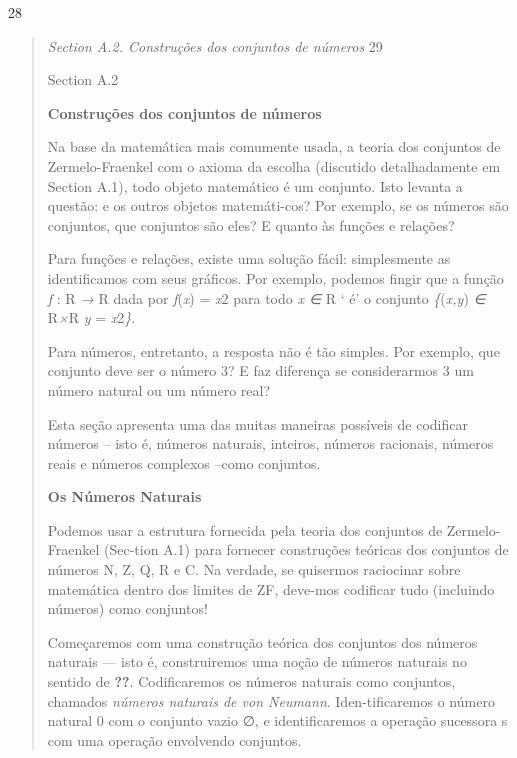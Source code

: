 \documentclass[
]{article}
\begin{document}
28

\begin{quote}
\emph{Section A.2. Construções dos conjuntos de números} 29

Section A.2

\textbf{Construções dos conjuntos de números}

Na base da matemática mais comumente usada, a teoria dos conjuntos de
Zermelo-Fraenkel com o axioma da escolha (discutido detalhadamente em
Section A.1), todo objeto matemático é um conjunto. Isto levanta a
questão: e os outros objetos matemáti-cos? Por exemplo, se os números
são conjuntos, que conjuntos são eles? E quanto às funções e relações?

Para funções e relações, existe uma solução fácil: simplesmente as
identificamos com seus gráficos. Por exemplo, podemos fingir que a
função \emph{f} : R \emph{→} R dada por \emph{f}(\emph{x}) = \emph{x}2
para todo \emph{x ∈} R ` é' o conjunto \emph{\{}(\emph{x,y}) \emph{∈}
R\emph{×}R \emph{\textbar{} y} = \emph{x}2\emph{\}}.

Para números, entretanto, a resposta não é tão simples. Por exemplo, que
conjunto deve ser o número 3? E faz diferença se considerarmos 3 um
número natural ou um número real?

Esta seção apresenta uma das muitas maneiras possíveis de codificar
números -- isto é, números naturais, inteiros, números racionais,
números reais e números complexos --como conjuntos.

\textbf{Os Números Naturais}

Podemos usar a estrutura fornecida pela teoria dos conjuntos de
Zermelo-Fraenkel (Sec-tion A.1) para fornecer construções teóricas dos
conjuntos de números N, Z, Q, R e C. Na verdade, se quisermos raciocinar
sobre matemática dentro dos limites de ZF, deve-mos codificar tudo
(incluindo números) como conjuntos!

Começaremos com uma construção teórica dos conjuntos dos números
naturais --- isto é, construiremos uma noção de números naturais no
sentido de \textbf{??}. Codificaremos os números naturais como
conjuntos, chamados \emph{números naturais de von Neumann}.
Iden-tificaremos o número natural 0 com o conjunto vazio ∅, e
identificaremos a operação sucessora s com uma operação envolvendo
conjuntos.
\end{quote}
\end{document}
